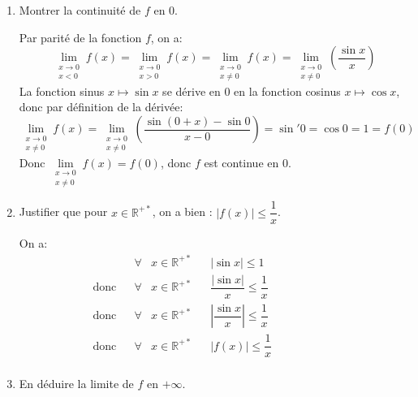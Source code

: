 \documentclass[a4paper,french,bookmarks]{article}
\begin{document}
\begin{enumerate}
\begin{enumerate}
  \item Montrer la continuité de $f$ en $0$.
  
  \begin{tcolorbox}[colback=black!3,colframe=black!9,boxrule=.25pt,enhanced,arc is angular,arc=0pt]
  Par parité de la fonction $f$, on a:
  \[ \lim\limits_{\substack{x \to 0\\x < 0}} f\left(x\right)= \lim\limits_{\substack{x \to 0\\x > 0}} f\left(x\right) = \lim\limits_{\substack{x \to 0\\x \neq 0}} f\left(x\right) = \lim\limits_{\substack{x \to 0\\x \neq 0}} \left(\dfrac{\sin x}{x}\right) \]
  La fonction sinus $x \mapsto \sin x$ se dérive en $0$ en la fonction cosinus $x \mapsto \cos x$, donc par définition de la dérivée:
  \[\lim\limits_{\substack{x \to 0\\x \neq 0}} f\left(x\right) = \lim\limits_{\substack{x \to 0\\x \neq 0}} \left(\dfrac{\sin \left(0 +x\right) - \sin 0 }{x - 0}\right) = \sin' 0 = \cos 0 = 1 = f(0) \]
  Donc $\lim\limits_{\substack{x \to 0\\x \neq 0}} f\left(x\right) =f(0)$, donc $f$ est continue en $0$.
  \end{tcolorbox}
  \item Justifier que pour $x \in \mathbb{R}^{+*}$, on a bien : \quad $\left|f\left(x\right)\right| \leq \dfrac{1}{x}$.
  
  \begin{tcolorbox}[colback=black!3,colframe=black!9,boxrule=.25pt,enhanced,arc is angular,arc=0pt]
  On a:
  \begin{align*}
      && \forall &x \in \mathbb{R}^{+*} && \left|\sin x\right| \leq 1 &&\qquad\qquad\\
\text{donc} && \forall &x \in \mathbb{R}^{+*} && \dfrac{\left|\sin x\right|}{x} \leq \dfrac{1}{x}\\
\text{donc} && \forall &x \in \mathbb{R}^{+*} && \left|\dfrac{\sin x}{x}\right| \leq \dfrac{1}{x}\\
\text{donc} && \forall &x \in \mathbb{R}^{+*} && \left|f\left(x\right)\right| \leq \dfrac{1}{x}\\
  \end{align*}
  \end{tcolorbox}
  
 \item En déduire la limite de $f$ en $+\infty$.
 

\end{enumerate}
\end{enumerate}
\end{document}
